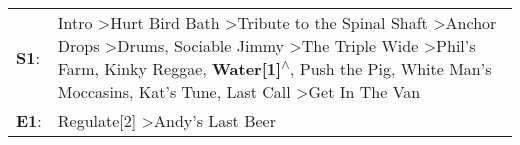 \begin{supertabular}{p{0.03\textwidth}p{0.92\textwidth}}
 \textbf{S1}:  &  Intro\textsuperscript{} \textgreater \enspace Hurt Bird Bath\textsuperscript{} \textgreater \enspace Tribute to the Spinal Shaft\textsuperscript{} \textgreater \enspace Anchor Drops\textsuperscript{} \textgreater \enspace Drums\textsuperscript{}, \enspace Sociable Jimmy\textsuperscript{} \textgreater \enspace The Triple Wide\textsuperscript{} \textgreater \enspace Phil's Farm\textsuperscript{}, \enspace Kinky Reggae\textsuperscript{}, \enspace \textbf{Water[1]\textsuperscript{$\wedge$}}, \enspace Push the Pig\textsuperscript{}, \enspace White Man's Moccasins\textsuperscript{}, \enspace Kat's Tune\textsuperscript{}, \enspace Last Call\textsuperscript{} \textgreater \enspace Get In The Van\textsuperscript{}  \enspace  \\
 \textbf{E1}:  &                                                                                                                                                                                                                                                                                                                                                                                                                                                                                                                                                                                                                                                      Regulate[2]\textsuperscript{} \textgreater \enspace Andy's Last Beer\textsuperscript{}  \enspace  \\
\end{supertabular}
